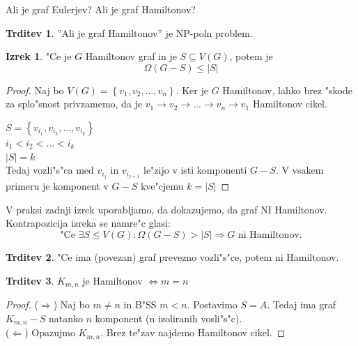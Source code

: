 \documentclass{article}
\theoremstyle{definition}
\newtheorem{claim}{Trditev}[section]
\newtheorem{theorem}{Izrek}[section]
\begin{document}
	Ali je graf Eulerjev? Ali je graf Hamiltonov?
	\begin{claim}
		''Ali je graf Hamiltonov'' je NP-poln problem. %
	\end{claim}

	\begin{theorem}
		"Ce je $G$ Hamiltonov graf in je $S \subseteq V(G)$, potem je
		$$\Omega(G-S) \leq |S|$$
		\begin{proof}
			Naj bo $V(G) = \left\lbrace v_1, v_2, \ldots, v_n \right\rbrace $. Ker je $G$ Hamiltonov, lahko brez "skode za splo"snost privzamemo, da je $v_1 \rightarrow v_2 \rightarrow ... \rightarrow v_n \rightarrow v_1 $ Hamiltonov cikel. 
			
			$S = \left\lbrace v_{i_1}, v_{i_2}, \ldots, v_{i_k} \right\rbrace $ \\
			$ i_1 < i_2 < \ldots < i_k $ \\
			$|S| = k$ \\
			Tedaj vozli"s"ca med $v_{i_j}$ in $v_{i_{j+1}}$ le"zijo v isti komponenti $G-S$.
			V vsakem primeru je komponent v $G-S$ kve"cjemu $k=|S|$
		\end{proof}
	\end{theorem}

	V praksi zadnji izrek uporabljamo, da dokazujemo, da graf NI Hamiltonov. Kontrapozicija izreka se namre"c glasi: 
	$$ \text{"Ce } \exists S \leq V(G): \Omega(G-S) > |S| \Rightarrow G \text{ ni Hamiltonov.}$$
	
	\begin{claim}
		"Ce ima (povezan) graf prevezno vozli"s"ce, potem ni Hamiltonov.
	\end{claim}
	\begin{claim}
		$ K_{m,n} $ je Hamiltonov $ \iff m=n $
		\begin{proof}
			($\Rightarrow$) Naj bo $m \neq n$ in B"SS $m < n$. Postavimo $S=A$. Tedaj ima graf $K_{m,n}-S$ natanko $n$ komponent (n izoliranih vosli"s"c). \\
			($\Leftarrow$)  Opazujmo $K_{m,n}$. Brez te"zav najdemo Hamiltonov cikel.
		\end{proof}
	\end{claim}
\end{document}
